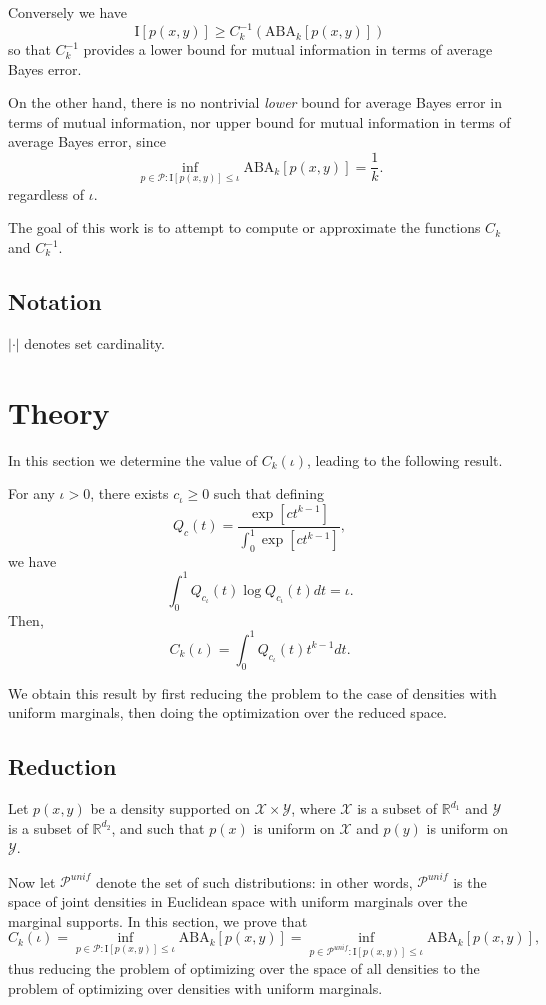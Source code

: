 \documentclass[12pt]{article}
\begin{document}
Conversely we have
\[
\text{I}[p(x,y)] \geq C^{-1}_k(\text{ABA}_k[p(x,y)])
\]
so that $C^{-1}_k$ provides a lower bound for mutual information in terms of average Bayes error.

On the other hand, there is no nontrivial \emph{lower} bound for average Bayes error in terms of mutual information,
nor upper bound for mutual information in terms of average Bayes error, since
\[
\inf_{p \in \mathcal{P}: \text{I}[p(x,y)] \leq \iota} \text{ABA}_k[p(x,y)] = \frac{1}{k}.
\]
regardless of $\iota$.

The goal of this work is to attempt to compute or approximate the functions $C_k$ and $C_k^{-1}$.

\subsection{Notation}

$|\cdot|$ denotes set cardinality.

\section{Theory}

In this section we determine the value of $C_k(\iota)$,
leading to the following result.

\begin{theorem}\label{theorem:Cunif}
For any $\iota > 0$, there exists $c_\iota \geq 0$ such that defining
\[
Q_c(t) = \frac{\exp[ct^{k-1}]}{\int_0^1 \exp[ct^{k-1}]},
\]
we have
\[
\int_0^1 Q_{c_\iota}(t) \log Q_{c_\iota}(t) dt = \iota.
\]
Then,
\[
C_k(\iota) = \int_0^1 Q_{c_\iota}(t) t^{k-1} dt.
\]
\end{theorem}

We obtain this result by first reducing the problem to the case of
densities with uniform marginals, then doing the optimization over the
reduced space.

\subsection{Reduction}

Let $p(x, y)$ be a density supported on
$\mathcal{X} \times \mathcal{Y}$, where $\mathcal{X}$ is a subset of
$\mathbb{R}^{d_1}$ and $\mathcal{Y}$ is a subset of
$\mathbb{R}^{d_2}$, and such that $p(x)$ is uniform on $\mathcal{X}$
and $p(y)$ is uniform on $\mathcal{Y}$.

Now let $\mathcal{P}^{unif}$ denote the set of such distributions:
in other words, $\mathcal{P}^{unif}$ is the space of joint densities in Euclidean space
with uniform marginals over the marginal supports.
In this section, we prove that
\[
C_k(\iota) =\inf_{p \in \mathcal{P}: \text{I}[p(x,y)] \leq \iota} \text{ABA}_k[p(x,y)] = 
\inf_{p \in \mathcal{P}^{unif}: \text{I}[p(x,y)] \leq \iota} \text{ABA}_k[p(x,y)],
\]
thus reducing the problem of optimizing over the space of all
densities to the problem of optimizing over densities with uniform
marginals.
\end{document}
